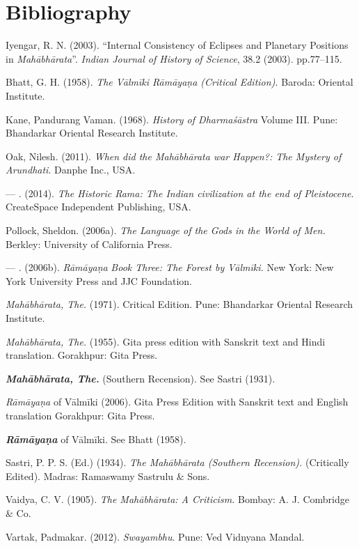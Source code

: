 \section*{Bibliography}

\begin{thebibliography}{99}
\itemsep=1pt
 Iyengar, R. N. (2003). “Internal Consistency of Eclipses and Planetary Positions in \textit{Mahābhārata}”. \textit{Indian Journal of History of Science}, 38.2 (2003). pp.77--115.

  Bhatt, G. H. (1958). \textit{The Vālmīki Rāmāyaṇa (Critical Edition).} Baroda: Oriental Institute.

  Kane, Pandurang Vaman. (1968). \textit{History of Dharmaśāstra} Volume III. Pune: Bhandarkar Oriental Research Institute.

  Oak, Nilesh. (2011). \textit{When did the Mahābhārata war Happen?: The Mystery of Arundhati}. Danphe Inc., USA.

  — . (2014). \textit{The Historic Rama: The Indian civilization at the end of Pleistocene}. CreateSpace Independent Publishing, USA.

  Pollock, Sheldon. (2006a). \textit{The Language of the Gods in the World of Men.} Berkley: University of California Press.

  — . (2006b). \textit{Rāmāyaṇa} \textit{Book Three: The Forest by Vālmīki.} New York: New York University Press and JJC Foundation.

  \textit{Mahābhārata, The.} (1971). Critical Edition. Pune: Bhandarkar Oriental Research Institute.

  \textit{Mahābhārata, The.} (1955). Gita press edition with Sanskrit text and Hindi translation. Gorakhpur: Gita Press.

  \textbf{\textit{Mahābhārata, The.}} (Southern Recension). See Sastri (1931).

  \textit{Rāmāyaṇa} of Vālmīki (2006). Gita Press Edition with Sanskrit text and English translation Gorakhpur: Gita Press.

  \textbf{\textit{Rāmāyaṇa}} of Vālmīki. See Bhatt (1958).

  Sastri, P. P. S. (Ed.) (1934). \textit{The Mahābhārata (Southern Recension).} (Critically Edited). Madras: Ramaswamy Sastrulu \& Sons.

  Vaidya, C. V. (1905). \textit{The Mahābhārata: A Criticism.} Bombay: A. J. Combridge \& Co.

  Vartak, Padmakar. (2012). \textit{Swayambhu}. Pune: Ved Vidnyana Mandal.

 \end{thebibliography}

